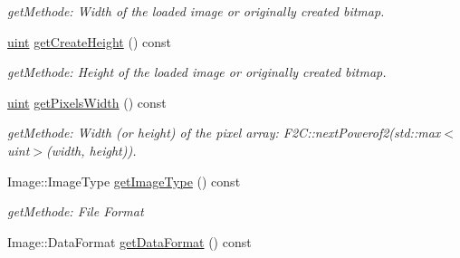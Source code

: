\begin{DoxyCompactItemize}
\begin{DoxyCompactList}\small\item\em getMethode: Width of the loaded image or originally created bitmap. \item\end{DoxyCompactList}\item 
\hypertarget{class_f2_c_1_1_bitmap_a05b176d9fe609a4d9678cb1e20ca65e2}{
\hyperlink{namespace_f2_c_a58be2bac9eb3e3c99cb41b6008bf4fae}{uint} \hyperlink{class_f2_c_1_1_bitmap_a05b176d9fe609a4d9678cb1e20ca65e2}{getCreateHeight} () const }
\label{class_f2_c_1_1_bitmap_a05b176d9fe609a4d9678cb1e20ca65e2}

\begin{DoxyCompactList}\small\item\em getMethode: Height of the loaded image or originally created bitmap. \item\end{DoxyCompactList}\item 
\hypertarget{class_f2_c_1_1_bitmap_ad51ff5cc348345114a1aa4ab5a368945}{
\hyperlink{namespace_f2_c_a58be2bac9eb3e3c99cb41b6008bf4fae}{uint} \hyperlink{class_f2_c_1_1_bitmap_ad51ff5cc348345114a1aa4ab5a368945}{getPixelsWidth} () const }
\label{class_f2_c_1_1_bitmap_ad51ff5cc348345114a1aa4ab5a368945}

\begin{DoxyCompactList}\small\item\em getMethode: Width (or height) of the pixel array: F2C::nextPowerof2(std::max$<$uint$>$(width, height)). \item\end{DoxyCompactList}\item 
\hypertarget{class_f2_c_1_1_bitmap_a49e44e01102035e194c95becff0778f5}{
Image::ImageType \hyperlink{class_f2_c_1_1_bitmap_a49e44e01102035e194c95becff0778f5}{getImageType} () const }
\label{class_f2_c_1_1_bitmap_a49e44e01102035e194c95becff0778f5}

\begin{DoxyCompactList}\small\item\em getMethode: File Format \item\end{DoxyCompactList}\item 
\hypertarget{class_f2_c_1_1_bitmap_a7ab273e73d0b9563fb9d3ea358fdbf05}{
Image::DataFormat \hyperlink{class_f2_c_1_1_bitmap_a7ab273e73d0b9563fb9d3ea358fdbf05}{getDataFormat} () const }
\label{class_f2_c_1_1_bitmap_a7ab273e73d0b9563fb9d3ea358fdbf05}


\end{DoxyCompactItemize}
